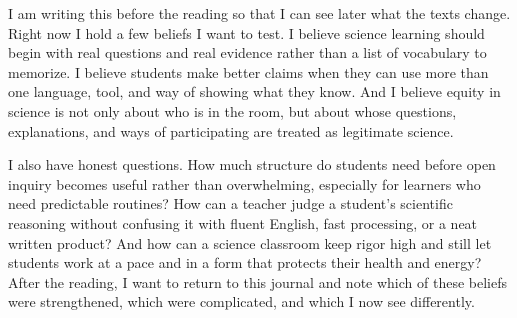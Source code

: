 \documentclass[11pt]{article}
\begin{document}
I am writing this before the reading so that I can see later what the texts change. Right now I hold a few beliefs I want to test. I believe science learning should begin with real questions and real evidence rather than a list of vocabulary to memorize. I believe students make better claims when they can use more than one language, tool, and way of showing what they know. And I believe equity in science is not only about who is in the room, but about whose questions, explanations, and ways of participating are treated as legitimate science.

I also have honest questions. How much structure do students need before open inquiry becomes useful rather than overwhelming, especially for learners who need predictable routines? How can a teacher judge a student's scientific reasoning without confusing it with fluent English, fast processing, or a neat written product? And how can a science classroom keep rigor high and still let students work at a pace and in a form that protects their health and energy? After the reading, I want to return to this journal and note which of these beliefs were strengthened, which were complicated, and which I now see differently.
\end{document}
